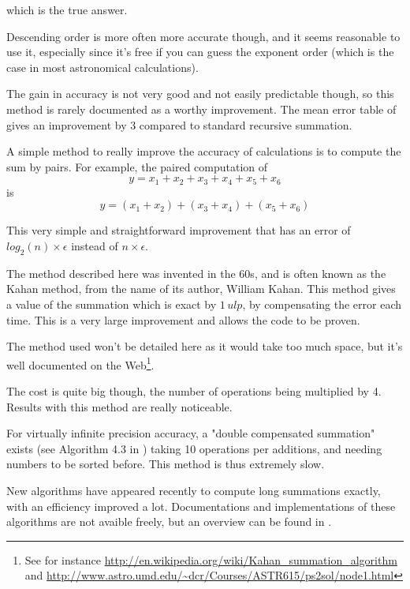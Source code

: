 which is the true answer.

Descending order is more often more accurate though, and it seems reasonable to use it, especially since it's free if you can guess the exponent order (which is the case in most astronomical calculations).

The gain in accuracy is not very good and not easily predictable though, so this method is rarely documented as a worthy improvement. The mean error table of \cite{Higham} gives an improvement by 3 compared to standard recursive summation.


A simple method to really improve the accuracy of calculations is to compute the sum by pairs. For example, the paired computation of $$y=x_1+x_2+x_3+x_4+x_5+x_6$$ is $$y=(x_1+x_2)+(x_3+x_4)+(x_5+x_6)$$

This very simple and straightforward improvement that has an error of $log_2(n)\times\epsilon$ instead of $n\times\epsilon$.

\label{compensated}

The method described here was invented in the 60s, and is often known as the Kahan method, from the name of its author, William Kahan. This method gives a value of the summation which is exact by $1\,ulp$, by compensating the error each time. This is a very large improvement and allows the code to be proven.

The method used won't be detailed here as it would take too much space, but it's well documented on the Web\footnote{See for instance \url{http://en.wikipedia.org/wiki/Kahan_summation_algorithm} and \url{http://www.astro.umd.edu/~dcr/Courses/ASTR615/ps2sol/node1.html}}.

The cost is quite big though, the number of operations being multiplied by 4. Results with this method are really noticeable.

For virtually infinite precision accuracy, a "double compensated summation" exists (see Algorithm 4.3 in \cite{Higham}) taking 10 operations per additions, and needing numbers to be sorted before. This method is thus extremely slow.


New algorithms have appeared recently to compute long summations exactly, with an efficiency improved a lot. Documentations and implementations of these algorithms are not avaible freely, but an overview can be found in \cite{Langlois}\TODO . %

